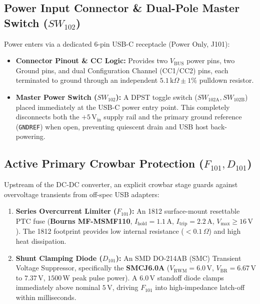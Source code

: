 \documentclass[11pt, letterpaper]{article}
\begin{document}
\subsection{Power Input Connector \& Dual-Pole Master Switch \texorpdfstring{($SW_{102}$)}{(SW102)}}
Power enters via a dedicated 6-pin USB-C receptacle (Power Only, J101):
\begin{itemize}[leftmargin=1.5em]
    \item \textbf{Connector Pinout \& CC Logic:} Provides two $V_{\text{BUS}}$ power pins, two Ground pins, and dual Configuration Channel (CC1/CC2) pins, each terminated to ground through an independent $5.1\,\text{k}\Omega \pm 1\%$ pulldown resistor.
    \item \textbf{Master Power Switch ($SW_{102}$):} A DPST toggle switch ($SW_{102\text{A}}, SW_{102\text{B}}$) placed immediately at the USB-C power entry point. This completely disconnects both the $+5\,\text{V}_{\text{in}}$ supply rail and the primary ground reference (\texttt{GNDREF}) when open, preventing quiescent drain and USB host back-powering.
\end{itemize}

\subsection{Active Primary Crowbar Protection \texorpdfstring{($F_{101}, D_{101}$)}{(F101, D101)}}
Upstream of the DC-DC converter, an explicit crowbar stage guards against overvoltage transients from off-spec USB adapters:
\begin{enumerate}[label=\textbf{\alph*.}]
    \item \textbf{Series Overcurrent Limiter ($F_{101}$):} An 1812 surface-mount resettable PTC fuse (\textbf{Bourns MF-MSMF110}, $I_{\text{hold}} = 1.1\,\text{A}$, $I_{\text{trip}} = 2.2\,\text{A}$, $V_{\text{max}} \ge 16\,\text{V}$). The 1812 footprint provides low internal resistance ($< 0.1\,\Omega$) and high heat dissipation.
    \item \textbf{Shunt Clamping Diode ($D_{101}$):} An SMD DO-214AB (SMC) Transient Voltage Suppressor, specifically the \textbf{SMCJ6.0A} ($V_{\text{RWM}} = 6.0\,\text{V}$, $V_{\text{BR}} = 6.67\,\text{V}$ to $7.37\,\text{V}$, $1500\,\text{W}$ peak pulse power). A $6.0\,\text{V}$ standoff diode clamps immediately above nominal $5\,\text{V}$, driving $F_{101}$ into high-impedance latch-off within milliseconds.
\end{enumerate}
\end{document}
